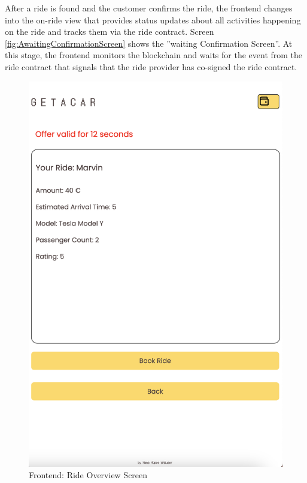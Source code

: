 After a ride is found and the customer confirms the ride, the frontend changes into the on-ride view that provides status updates about all activities happening on the ride and tracks them via the ride contract. Screen \ref{fig:AwaitingConfirmationScreen} shows the ''waiting Confirmation Screen''. At this stage, the frontend monitors the blockchain and waits for the event from the ride contract that signals that the ride provider has co-signed the ride contract.


\begin{figure}[H]
    \centering
    
    \begin{minipage}{0.45\linewidth}
        \centering
        \includegraphics[width=\linewidth]{data/ffss/5.png}
        \caption{Frontend: Ride Overview Screen}

\end{minipage}
\end{figure}
